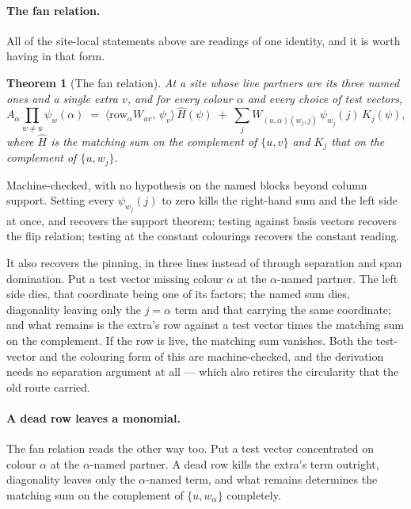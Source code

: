 \documentclass[11pt]{article}
\newtheorem{theorem}{Theorem}[section]
\theoremstyle{definition}
\theoremstyle{remark}
\begin{document}
\paragraph{The fan relation.} All of the site-local statements above are readings of one
identity, and it is worth having in that form.

\begin{theorem}[The fan relation]\label{thm:fanrel}
At a site whose live partners are its three named ones and a single extra $v$, and for every
colour $\alpha$ and every choice of test vectors,
\[
  A_\alpha \prod_{w \neq u} \psi_w(\alpha)
    \;=\; \langle \mathrm{row}_\alpha W_{uv},\, \psi_v\rangle\, \hat H(\psi)
      \;+\; \sum_j W_{(u,\alpha)(w_j,j)}\, \psi_{w_j}(j)\, K_j(\psi),
\]
where $\hat H$ is the matching sum on the complement of $\{u,v\}$ and $K_j$ that on the
complement of $\{u,w_j\}$.
\end{theorem}

Machine-checked, with no hypothesis on the named blocks beyond column support. Setting every
$\psi_{w_j}(j)$ to zero kills the right-hand sum and the left side at once, and recovers the
support theorem; testing against basis vectors recovers the flip relation; testing at the
constant colourings recovers the constant reading.

It also recovers the pinning, in three lines instead of through separation and span
domination. Put a test vector missing colour $\alpha$ at the $\alpha$-named partner. The left
side dies, that coordinate being one of its factors; the named sum dies, diagonality leaving
only the $j = \alpha$ term and that carrying the same coordinate; and what remains is the
extra's row against a test vector times the matching sum on the complement. If the row is
live, the matching sum vanishes. Both the test-vector and the colouring form of this are
machine-checked, and the derivation needs no separation argument at all --- which also
retires the circularity that the old route carried.

\paragraph{A dead row leaves a monomial.} The fan relation reads the other way too. Put a
test vector concentrated on colour $\alpha$ at the $\alpha$-named partner. A dead row kills
the extra's term outright, diagonality leaves only the $\alpha$-named term, and what remains
determines the matching sum on the complement of $\{u,w_\alpha\}$ completely.
\end{document}
